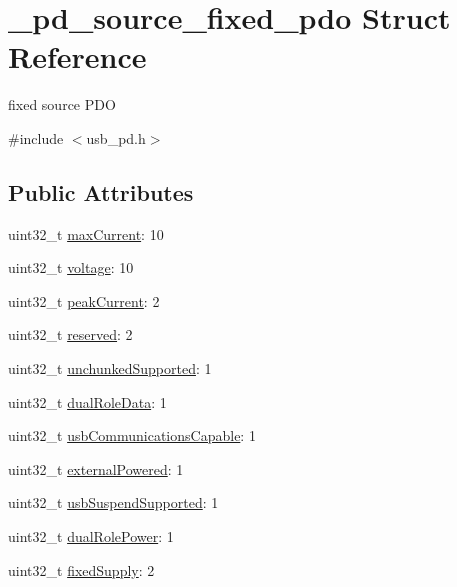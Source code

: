 \hypertarget{struct__pd__source__fixed__pdo}{\section{\-\_\-pd\-\_\-source\-\_\-fixed\-\_\-pdo Struct Reference}
\label{struct__pd__source__fixed__pdo}
}


fixed source P\-D\-O  




{\ttfamily \#include $<$usb\-\_\-pd.\-h$>$}

\subsection*{Public Attributes}
\begin{DoxyCompactItemize}
\item 
uint32\-\_\-t \hyperlink{struct__pd__source__fixed__pdo_a1bb1756a3f7fe82e0395efac18eb8f41}{max\-Current}\-: 10
\item 
uint32\-\_\-t \hyperlink{struct__pd__source__fixed__pdo_abba8fe6a9f4c4f6ac33cbfe075945e6a}{voltage}\-: 10
\item 
uint32\-\_\-t \hyperlink{struct__pd__source__fixed__pdo_a1a27fc2753ab60196afd3813e158d413}{peak\-Current}\-: 2
\item 
uint32\-\_\-t \hyperlink{struct__pd__source__fixed__pdo_a804529193e9d8df5aec299308e357ea1}{reserved}\-: 2
\item 
uint32\-\_\-t \hyperlink{struct__pd__source__fixed__pdo_a6e793acf2c695c57030e59f28dc5b65a}{unchunked\-Supported}\-: 1
\item 
uint32\-\_\-t \hyperlink{struct__pd__source__fixed__pdo_a9965da25ad2e4b58fd579e5a0632145a}{dual\-Role\-Data}\-: 1
\item 
uint32\-\_\-t \hyperlink{struct__pd__source__fixed__pdo_a0e2f3fc73e269168132defedb85f9d9f}{usb\-Communications\-Capable}\-: 1
\item 
uint32\-\_\-t \hyperlink{struct__pd__source__fixed__pdo_aa1715617698b348913227183195ae8f5}{external\-Powered}\-: 1
\item 
uint32\-\_\-t \hyperlink{struct__pd__source__fixed__pdo_aa836f41dcaaafe17d4ff65eeb3729b6d}{usb\-Suspend\-Supported}\-: 1
\item 
uint32\-\_\-t \hyperlink{struct__pd__source__fixed__pdo_afcce88f5e0b229d32e79297566e80dfd}{dual\-Role\-Power}\-: 1
\item 
uint32\-\_\-t \hyperlink{struct__pd__source__fixed__pdo_a2375dc4363d49f14521f1f7f6adffcde}{fixed\-Supply}\-: 2
\end{DoxyCompactItemize}


